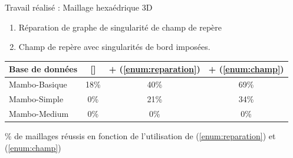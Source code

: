 \begin{frame}{Travail réalisé : Maillage hexaédrique 3D}
    \small
    \centering
    \begin{enumerate}
        \item Réparation de graphe de singularité de champ de repère \label{enum:reparation}
        \item Champ de repère avec singularités de bord imposées. \label{enum:champ}
    \end{enumerate}
    \begin{table}
    \centering
    \scriptsize
    \begin{tabular}{|l|c|c|c|}
    \hline
    Base de données & [\cite{ray_practical_2016}] & + (\ref{enum:reparation}) & + (\ref{enum:champ}) \\
    \hline
    Mambo-Basique & 18\% & 40\% & 69\% \\
    \hline
    Mambo-Simple & 0\% & 21\% & 34\% \\
    \hline
    Mambo-Medium & 0\% & 0\% & 0\% \\
    \hline
    \end{tabular}
    \end{table}
    \% de maillages réussis  en fonction de l'utilisation de (\ref{enum:reparation}) et (\ref{enum:champ})
\end{frame}
